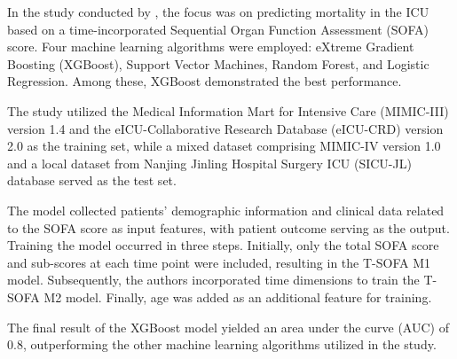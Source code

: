 \documentclass[12pt,a4paper,english
]{tunithesis}
\begin{document}
In the study conducted by \textcite{liu2022}, the focus was on predicting mortality in the ICU based on a time-incorporated Sequential Organ Function Assessment (SOFA) score. Four machine learning algorithms were employed: eXtreme Gradient Boosting (XGBoost), Support Vector Machines, Random Forest, and Logistic Regression. Among these, XGBoost demonstrated the best performance.

The study utilized the Medical Information Mart for Intensive Care (MIMIC-III) version 1.4 and the eICU-Collaborative Research Database (eICU-CRD) version 2.0 as the training set, while a mixed dataset comprising MIMIC-IV version 1.0 and a local dataset from Nanjing Jinling Hospital Surgery ICU (SICU-JL) database served as the test set.

The model collected patients' demographic information and clinical data related to the SOFA score as input features, with patient outcome serving as the output. Training the model occurred in three steps. Initially, only the total SOFA score and sub-scores at each time point were included, resulting in the T-SOFA M1 model. Subsequently, the authors incorporated time dimensions to train the T-SOFA M2 model. Finally, age was added as an additional feature for training.

The final result of the XGBoost model yielded an area under the curve (AUC) of 0.8, outperforming the other machine learning algorithms utilized in the study.

 
\end{document}
